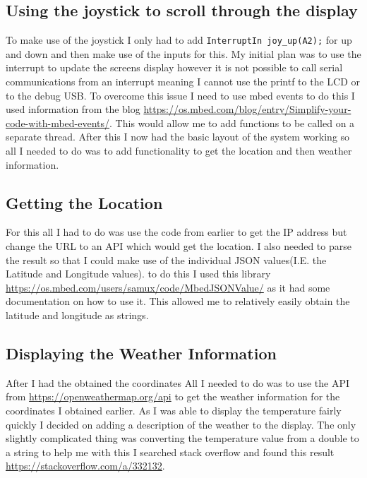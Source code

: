 \documentclass[a4paper,12pt]{scrartcl}
\begin{document}
{		\subsection{Using the joystick to scroll through the display}
		{
			To make use of the joystick I only had to add \lstinline|InterruptIn joy_up(A2);| for up and down and then make use of the inputs for this. My initial plan was to use the interrupt to update the screens display however it is not possible to call serial communications from an interrupt meaning I cannot use the printf to the LCD or to the debug USB. To overcome this issue I need to use mbed events to do this I used information from the blog \url{https://os.mbed.com/blog/entry/Simplify-your-code-with-mbed-events/}\cite{Jongboom2018}. This would allow me to add functions to be called on a separate thread. After this I now had the basic layout of the system working so all I needed to do was to add functionality to get the location and then weather information.
		}
		\subsection{Getting the Location}
		{
			For this all I had to do was use the code from earlier to get the IP address but change the URL to an API which would get the location. I also needed to parse the result so that I could make use of the individual JSON values(I.E. the Latitude and Longitude values). to do this I used this library \url{https://os.mbed.com/users/samux/code/MbedJSONValue/} as it had some documentation on how to use it. This allowed me to relatively easily obtain the latitude and longitude as strings.
		}
		\subsection{Displaying the Weather Information}
		{
			After I had the obtained the coordinates All I needed to do was to use the API from \url{https://openweathermap.org/api} to get the weather information for the coordinates I obtained earlier. As I was able to display the temperature fairly quickly I decided on adding a description of the weather to the display. The  only slightly complicated thing was converting the temperature value from a double to a string to help me with this I searched stack overflow and found this result \url{https://stackoverflow.com/a/332132}\cite{Schaub2008}.
		}
	}
	
\end{document}
